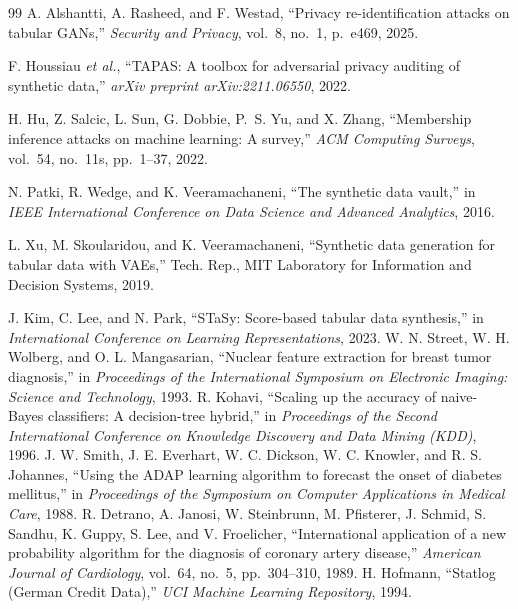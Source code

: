 \documentclass[preprint,12pt]{elsarticle}
\begin{document}
\begin{thebibliography}{99}
A. Alshantti, A. Rasheed, and F. Westad,
``Privacy re-identification attacks on tabular GANs,''
\emph{Security and Privacy}, vol.~8, no.~1, p.~e469, 2025.

F. Houssiau \emph{et al.},
``TAPAS: A toolbox for adversarial privacy auditing of synthetic data,''
\emph{arXiv preprint arXiv:2211.06550}, 2022.

H. Hu, Z. Salcic, L. Sun, G. Dobbie, P.~S. Yu, and X. Zhang,
``Membership inference attacks on machine learning: A survey,''
\emph{ACM Computing Surveys}, vol.~54, no.~11s, pp.~1--37, 2022.

N. Patki, R. Wedge, and K. Veeramachaneni,
``The synthetic data vault,''
in \emph{IEEE International Conference on Data Science and Advanced Analytics}, 2016.

L. Xu, M. Skoularidou, and K. Veeramachaneni,
``Synthetic data generation for tabular data with VAEs,''
Tech. Rep., MIT Laboratory for Information and Decision Systems, 2019.

J. Kim, C. Lee, and N. Park,
``STaSy: Score-based tabular data synthesis,''
in \emph{International Conference on Learning Representations}, 2023.
W. N. Street, W. H. Wolberg, and O. L. Mangasarian,
``Nuclear feature extraction for breast tumor diagnosis,''
in \emph{Proceedings of the International Symposium on Electronic Imaging: Science and Technology}, 1993.
R. Kohavi,
``Scaling up the accuracy of naive-Bayes classifiers: A decision-tree hybrid,''
in \emph{Proceedings of the Second International Conference on Knowledge Discovery and Data Mining (KDD)}, 1996.
J. W. Smith, J. E. Everhart, W. C. Dickson, W. C. Knowler, and R. S. Johannes,
``Using the ADAP learning algorithm to forecast the onset of diabetes mellitus,''
in \emph{Proceedings of the Symposium on Computer Applications in Medical Care}, 1988.
R. Detrano, A. Janosi, W. Steinbrunn, M. Pfisterer, J. Schmid,
S. Sandhu, K. Guppy, S. Lee, and V. Froelicher,
``International application of a new probability algorithm for the diagnosis of coronary artery disease,''
\emph{American Journal of Cardiology}, vol.~64, no.~5, pp.~304--310, 1989.
H. Hofmann,
``Statlog (German Credit Data),''
\emph{UCI Machine Learning Repository}, 1994.

\end{thebibliography}
\end{document}
